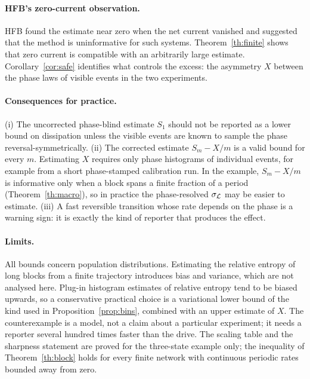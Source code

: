\documentclass[11pt,a4paper]{article}
\begin{document}
\paragraph{HFB's zero-current observation.} HFB found the estimate near zero when the net current vanished and suggested that the method is uninformative for such systems. Theorem~\ref{th:finite} shows that zero current is compatible with an arbitrarily large estimate. Corollary~\ref{cor:safe} identifies what controls the excess: the asymmetry $X$ between the phase laws of visible events in the two experiments.

\paragraph{Consequences for practice.} (i) The uncorrected phase-blind estimate $S_1$ should not be reported as a lower bound on dissipation unless the visible events are known to sample the phase reversal-symmetrically. (ii) The corrected estimate $S_m-X/m$ is a valid bound for every $m$. Estimating $X$ requires only phase histograms of individual events, for example from a short phase-stamped calibration run. In the example, $S_m-X/m$ is informative only when a block spans a finite fraction of a period (Theorem~\ref{th:macro}), so in practice the phase-resolved $\sigma_{\cal L}$ may be easier to estimate. (iii) A fast reversible transition whose rate depends on the phase is a warning sign: it is exactly the kind of reporter that produces the effect.

\paragraph{Limits.} All bounds concern population distributions. Estimating the relative entropy of long blocks from a finite trajectory introduces bias and variance, which are not analysed here. Plug-in histogram estimates of relative entropy tend to be biased upwards, so a conservative practical choice is a variational lower bound of the kind used in Proposition~\ref{prop:bins}, combined with an upper estimate of $X$. The counterexample is a model, not a claim about a particular experiment; it needs a reporter several hundred times faster than the drive. The scaling table and the sharpness statement are proved for the three-state example only; the inequality of Theorem~\ref{th:block} holds for every finite network with continuous periodic rates bounded away from zero.
\end{document}
